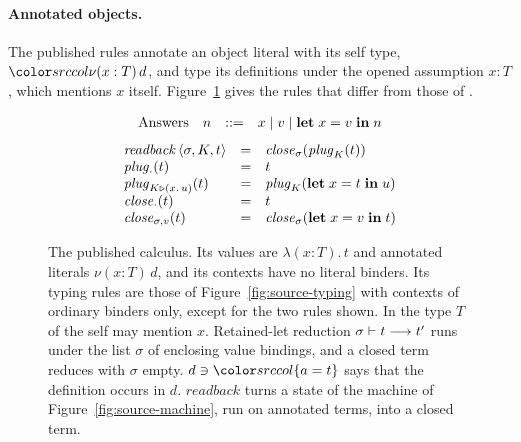 \paragraph{Annotated objects.}
The published rules annotate an object literal with its self type, $\src{\nu(x : T)\,d}$, and type its definitions under the opened assumption $x : T$, which mentions $x$ itself. Figure~\ref{fig:published} gives the rules that differ from those of \DOTMNF.
\begin{figure}
\small
{}
\[
\begin{array}{@{}lrcl@{}}
\text{Answers} & n & ::= & x \mid v \mid \klet x = v \kin n
\end{array}
\]
\[
\begin{array}{@{}lcl@{}}
\mathit{readback}\,\mst{\sigma}{K}{t} & = & \mathit{close}_\sigma(\mathit{plug}_K(t)) \\
\mathit{plug}_{\cdot}(t) & = & t \\
\mathit{plug}_{K \triangleright (x.\,u)}(t) & = & \mathit{plug}_K(\klet x = t \kin u) \\
\mathit{close}_{\cdot}(t) & = & t \\
\mathit{close}_{\sigma, v}(t) & = & \mathit{close}_\sigma(\klet x = v \kin t)
\end{array}
\]
\caption{The published calculus. Its values are $\lambda(x : T).\,t$ and annotated literals $\nu(x : T)\,d$, and its contexts have no literal binders. Its typing rules are those of Figure~\ref{fig:source-typing} with contexts of ordinary binders only, except for the two rules shown. In  the type $T$ of the self may mention $x$. Retained-let reduction $\sigma \vdash t \longrightarrow t'$ runs under the list $\sigma$ of enclosing value bindings, and a closed term reduces with $\sigma$ empty. $d \ni \ddeftrm{a}{t}$ says that the definition occurs in $d$. $\mathit{readback}$ turns a state of the machine of Figure~\ref{fig:source-machine}, run on annotated terms, into a closed term.}
\label{fig:published}
\end{figure}
